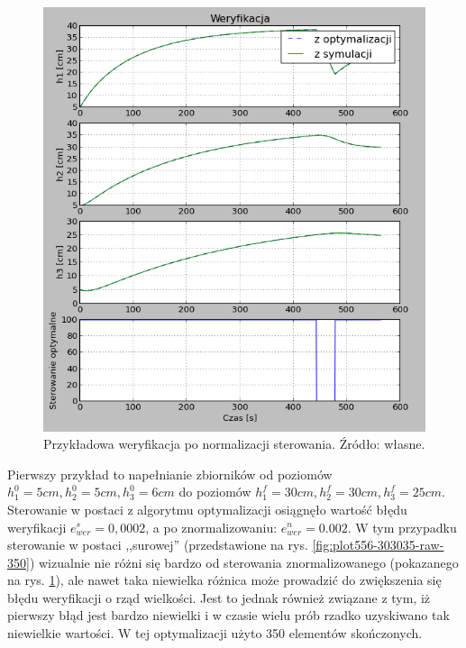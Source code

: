 \begin{figure}[htp]
    \centering
    \includegraphics{Grafika/plot_5_5_6-30_30_25-normalised-350}
    \caption{Przykładowa weryfikacja po normalizacji sterowania. Źródło: własne.}
    \label{fig:plot556-303035-normalised-350}
\end{figure}

Pierwszy przykład to napełnianie zbiorników od poziomów $h_{1}^{0} = 5 cm, h_{2}^{0} = 5 cm, h_{3}^{0} = 6 cm$ do poziomów $h_{1}^{f} = 30 cm, h_{2}^{f} = 30 cm, h_{3}^{f} = 25 cm$. Sterowanie w postaci z algorytmu optymalizacji osiągnęło wartość błędu weryfikacji $e_{wer}^{s} = 0,0002$, a po znormalizowaniu: $e_{wer}^{n} = 0.002$. W tym przypadku sterowanie w postaci ,,surowej'' (przedstawione na rys. \ref{fig:plot556-303035-raw-350}) wizualnie nie różni się bardzo od sterowania znormalizowanego (pokazanego na rys. \ref{fig:plot556-303035-normalised-350}), ale nawet taka niewielka różnica może prowadzić do zwiększenia się błędu weryfikacji o rząd wielkości. Jest to jednak również związane z tym, iż pierwszy błąd jest bardzo niewielki i w czasie wielu prób rzadko uzyskiwano tak niewielkie wartości. W tej optymalizacji użyto 350 elementów skończonych.

